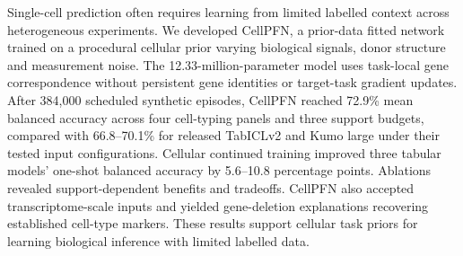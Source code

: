 Single-cell prediction often requires learning from limited labelled context across heterogeneous experiments. We developed CellPFN, a prior-data fitted network trained on a procedural cellular prior varying biological signals, donor structure and measurement noise. The 12.33-million-parameter model uses task-local gene correspondence without persistent gene identities or target-task gradient updates. After 384,000 scheduled synthetic episodes, CellPFN reached 72.9\% mean balanced accuracy across four cell-typing panels and three support budgets, compared with 66.8--70.1\% for released TabICLv2 and Kumo large under their tested input configurations. Cellular continued training improved three tabular models' one-shot balanced accuracy by 5.6--10.8 percentage points. Ablations revealed support-dependent benefits and tradeoffs. CellPFN also accepted transcriptome-scale inputs and yielded gene-deletion explanations recovering established cell-type markers.  These results support cellular task priors for learning biological inference with limited labelled data.
